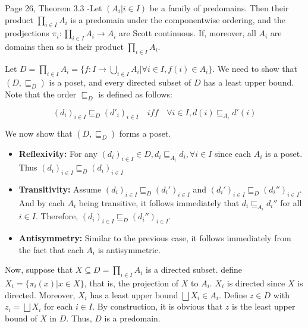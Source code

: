 \begin{problem}{Page 26, Theorem 3.3}
    -Let $(A_i | i \in I)$ be a family of predomains. Then their product $\prod_{i \in I} A_i$ is a predomain
    under the componentwise ordering, and the prodjections $\pi_i : \prod_{i \in I} A_i \to A_i$ are Scott continuous. If, moreover, all $A_i$ are domains then so is their product $\prod_{i \in I} A_i$.
\end{problem}

\begin{solution}
    Let $D = \prod_{i \in I} A_i = \{ f : I \to \bigcup_{i \in I} A_i | \forall i \in I, f(i) \in A_i \}$. We need to show that $(D, \sqsubseteq_D)$ is a poset, and every directed subset of $D$ has a least upper bound. Note that the order $\sqsubseteq_D$ is defined as follows:

$$ (d_i)_{i \in I} \sqsubseteq_D (d'_i)_{i \in I} \quad iff \quad \forall i \in I, d(i) \sqsubseteq_{A_i} d'(i) $$

We now show that $(D, \sqsubseteq_D)$ forms a poset. 
\begin{itemize}
    \item \textbf{Reflexivity:} For any $(d_i)_{i \in I} \in D, d_i \sqsubseteq_{A_i} d_i, \forall i \in I$ since each $A_i$ is a poset. Thus $(d_i)_{i \in I} \sqsubseteq_D (d_i)_{i \in I}$
    \item \textbf{Transitivity:} Assume $(d_i)_{i \in I} \sqsubseteq_D (d_i')_{i \in I}$ and $(d_i')_{i \in I} \sqsubseteq_D (d_i'')_{i \in I}$. And by each $A_i$ being transitive, it follows immediately that $d_i \sqsubseteq_{A_i} d_i''$ for all $i \in I$. Therefore, $(d_i)_{i \in I} \sqsubseteq_D (d_i'')_{i \in I}$.
    \item \textbf{Antisymmetry:} Similar to the previous case, it follows immediately from the fact that each $A_i$ is antisymmetric.
\end{itemize}

Now, suppose that $X \subseteq D = \prod_{i \in I} A_i$ is a directed subset. define 
    $X_i = \{ \pi_i(x) | x \in X \} $, that is, the projection of $X$ to $A_i$. $X_i$ is directed since $X$ is directed.
    Moreover, $X_i$ has a least upper bound $ \bigsqcup X_i \in A_i $. Define $z \in D$
    with $z_i = \bigsqcup X_i$ for each $i \in I$. By construction, it is obvious that $z$ is the least upper bound of $X$ in $D$.
    Thus, $D$ is a predomain.
\end{solution}